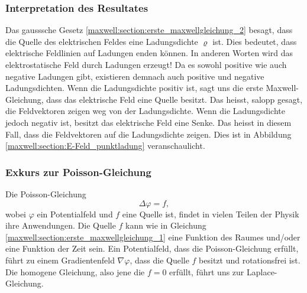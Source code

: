 \subsubsection{Interpretation des Resultates}
Das gausssche Gesetz \eqref{maxwell:section:erste_maxwellgleichung_2} besagt, dass die Quelle des elektrischen Feldes eine Ladungsdichte $\varrho$ ist.
Dies bedeutet, dass elektrische Feldlinien auf Ladungen enden können.
In anderen Worten wird das elektrostatische Feld durch Ladungen erzeugt!
Da es sowohl positive wie auch negative Ladungen gibt, existieren demnach auch positive und negative Ladungsdichten.
Wenn die Ladungsdichte positiv ist, sagt uns die erste Maxwell-Gleichung, dass das elektrische Feld eine Quelle besitzt.
Das heisst, salopp gesagt, die Feldvektoren zeigen weg von der Ladungsdichte.
Wenn die Ladungsdichte jedoch negativ ist, besitzt das elektrische Feld eine Senke.
Das heisst in diesem Fall, dass die Feldvektoren auf die Ladungsdichte zeigen. Dies ist in Abbildung \ref{maxwell:section:E-Feld_punktladung} veranschaulicht.

\subsubsection{Exkurs zur Poisson-Gleichung}
Die Poisson-Gleichung
\[
\Delta\varphi
=
f,
\]
wobei $\varphi$ ein Potentialfeld und $f$ eine Quelle ist, findet in vielen Teilen der Physik ihre Anwendungen.
Die Quelle $f$ kann wie in Gleichung \eqref{maxwell:section:erste_maxwellgleichung_1} eine Funktion des Raumes und/oder eine Funktion der Zeit sein.
Ein Potentialfeld, dass die Poisson-Gleichung erfüllt, führt zu einem Gradientenfeld $\nabla\varphi$, dass die Quelle $f$ besitzt und rotationsfrei ist.
Die homogene Gleichung, also jene die $f = 0$ erfüllt, führt uns zur Laplace-Gleichung.







